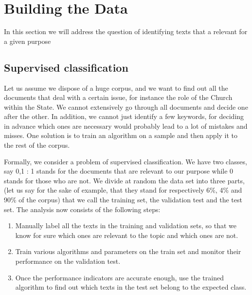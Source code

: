 \documentclass[a4paper,11pt]{article}
\begin{document}
\section{Building the Data}

In this section we will address the question of identifying texts that a relevant for a given purpose

\subsection*{Supervised classification}

Let us assume we dispose of a huge corpus, and we want to find out all the documents that deal with a certain issue, for instance the role of the Church within the State. We cannot extensively go through all documents and decide one after the other. In addition, we cannot just identify a few keywords, for deciding in advance which ones are necessary would probably lead to a lot of mistakes and misses. One solution is to train an algorithm on a sample and then apply it to the rest of the corpus.

Formally, we consider a problem of supervised classification. We have two classes, say 0,1 : 1 stands for the documents that are relevant to our purpose while 0 stands for those who are not. We divide at random the data set into three parts, (let us say for the sake of example, that they stand for respectively 6\%, 4\% and 90\% of the corpus) that we call the training set, the validation test and the test set. The analysis now consists of the following steps:
\begin{enumerate}
	\item Manually label all the texts in the training and validation sets, so that we know for sure which ones are relevant to the topic and which ones are not.
	\item Train various algorithms and parameters on the train set and monitor their performance on the validation test.
	\item Once the performance indicators are accurate enough, use the trained algorithm to find out which texts in the test set belong to the expected class.
\end{enumerate}
\end{document}

